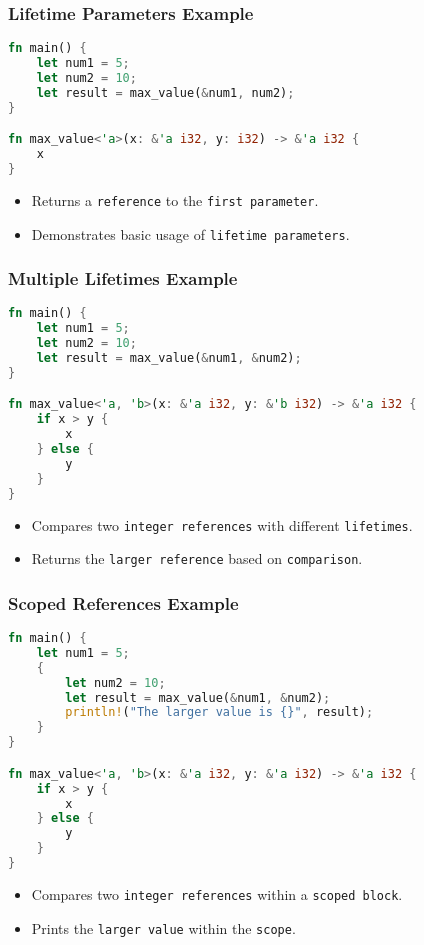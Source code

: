 \documentclass[aspectratio=169, table]{beamer}
\begin{document}
\begin{frame}[fragile]
\frametitle{Lifetime Parameters Example}
\begin{lstlisting}[language=Rust]
fn main() {
	let num1 = 5;
	let num2 = 10;
	let result = max_value(&num1, num2);
}

fn max_value<'a>(x: &'a i32, y: i32) -> &'a i32 {
	x
}
\end{lstlisting}
\begin{itemize}
\item Returns a \texttt{reference} to the \texttt{first\ parameter}.
\item Demonstrates basic usage of \texttt{lifetime\ parameters}.
\end{itemize}
\end{frame}

\begin{frame}[fragile]
\frametitle{Multiple Lifetimes Example}
\begin{lstlisting}[language=Rust]
fn main() {
	let num1 = 5;
	let num2 = 10;
	let result = max_value(&num1, &num2);
}

fn max_value<'a, 'b>(x: &'a i32, y: &'b i32) -> &'a i32 {
	if x > y {
		x
	} else {
		y
	}
}
\end{lstlisting}
\begin{itemize}
\item Compares two \texttt{integer\ references} with different \texttt{lifetimes}.
\item Returns the \texttt{larger\ reference} based on \texttt{comparison}.
\end{itemize}
\end{frame}

\begin{frame}[fragile]
\frametitle{Scoped References Example}
\begin{lstlisting}[language=Rust]
fn main() {
	let num1 = 5;
	{
		let num2 = 10;
		let result = max_value(&num1, &num2);
		println!("The larger value is {}", result);
	}
}

fn max_value<'a, 'b>(x: &'a i32, y: &'a i32) -> &'a i32 {
	if x > y {
		x
	} else {
		y
	}
}
\end{lstlisting}
\begin{itemize}
\item Compares two \texttt{integer\ references} within a \texttt{scoped\ block}.
\item Prints the \texttt{larger\ value} within the \texttt{scope}.
\end{itemize}
\end{frame}
\end{document}
